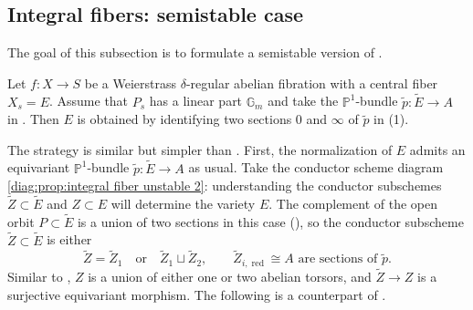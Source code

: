 \documentclass[reqno, letterpaper]{amsart}
\numberwithin{equation}{subsection}
\let\to\longrightarrow
\newcommand{\GG}{\mathbb{G}}
\newcommand{\PP}{\mathbb{P}}
\DeclareMathOperator{\red}{red}
\begin{document}
			
			
	\subsection{Integral fibers: semistable case}
		The goal of this subsection is to formulate a semistable version of .
		
		\begin{proposition} \label{prop:Weierstrass fiber semistable}
			Let $f : X \to S$ be a Weierstrass $\delta$-regular abelian fibration with a central fiber $X_s = E$. Assume that $P_s$ has a linear part $\GG_m$ and take the $\PP^1$-bundle $\tilde p : \tilde E \to A$ in . Then $E$ is obtained by identifying two sections $0$ and $\infty$ of $\tilde p$ in (1).
		\end{proposition}
		
		The strategy is similar but simpler than . First, the normalization of $E$ admits an equivariant $\PP^1$-bundle $\tilde p : \tilde E \to A$ as usual. Take the conductor scheme diagram \eqref{diag:prop:integral fiber unstable 2}: understanding the conductor subschemes $\tilde Z \subset \tilde E$ and $Z \subset E$ will determine the variety $E$. The complement of the open orbit $P \subset \tilde E$ is a union of two sections in this case (), so the conductor subscheme $\tilde Z \subset \tilde E$ is either
		\[ \tilde Z = \tilde Z_1 \quad\mbox{or}\quad \tilde Z_1 \sqcup \tilde Z_2 ,\qquad \tilde Z_{i, \red} \cong A \mbox{ are sections of } \tilde p .\]
		Similar to , $Z$ is a union of either one or two abelian torsors, and $\tilde Z \to Z$ is a surjective equivariant morphism. The following is a counterpart of .
		
\end{document}
